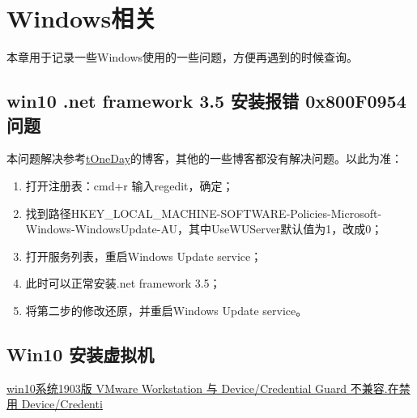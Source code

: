 \chapter{Windows相关}
本章用于记录一些Windows使用的一些问题，方便再遇到的时候查询。
\section{win10 .net framework 3.5 安装报错 0x800F0954问题}
本问题解决参考\href{https://blog.csdn.net/asd77882566/article/details/80024043}{tOneDay}的博客，其他的一些博客都没有解决问题。以此为准：
\begin{enumerate}
	\item 打开注册表：cmd+r 输入regedit，确定；
	\item 找到路径HKEY\_LOCAL\_MACHINE-SOFTWARE-Policies-Microsoft-Windows-WindowsUpdate-AU，其中UseWUServer默认值为1，改成0；
	\item 打开服务列表，重启Windows Update service；
	\item 此时可以正常安装.net framework 3.5；
	\item 将第二步的修改还原，并重启Windows Update service。
\end{enumerate}

\section{Win10 安装虚拟机}
\href{https://blog.csdn.net/weixin_44779019/article/details/95219733?utm_source=distribute.pc_relevant.none-task}{win10系统1903版 VMware Workstation 与 Device/Credential Guard 不兼容.在禁用 Device/Credenti}